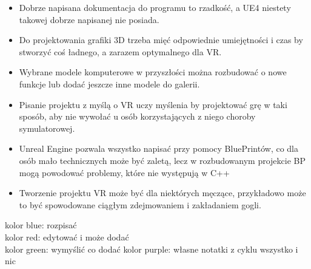 \documentclass[a4paper,12pt,reqno]{article}
\begin{document}
\begin{itemize}
\item Dobrze napisana dokumentacja do programu to rzadkość, a UE4 niestety takowej dobrze napisanej nie posiada.
\item Do projektowania grafiki 3D trzeba mięć odpowiednie umiejętności i czas by stworzyć coś ładnego, a zarazem optymalnego dla VR.
\item Wybrane modele komputerowe w przyszłości można rozbudować o nowe funkcje lub dodać jeszcze inne modele do galerii.
\item Pisanie projektu z myślą o VR uczy myślenia by projektować grę w taki sposób, aby nie wywołać u osób korzystających z niego choroby symulatorowej.
\item Unreal Engine pozwala wszystko napisać przy pomocy BluePrintów, co dla osób mało technicznych może być zaletą, lecz w rozbudowanym projekcie BP mogą powodować problemy, które nie występują w C++
\item Tworzenie projektu VR może być dla niektórych męczące, przykładowo może to być spowodowane ciągłym zdejmowaniem i zakładaniem gogli.
\end{itemize}

\newpage




{\color{blue} kolor blue: rozpisać}\\
{\color{red} kolor red: edytować i może dodać}\\
{\color{green} kolor green: wymyślić co dodać}
{\color{purple} kolor purple: własne notatki z cyklu wszystko i nic}
\end{document}
